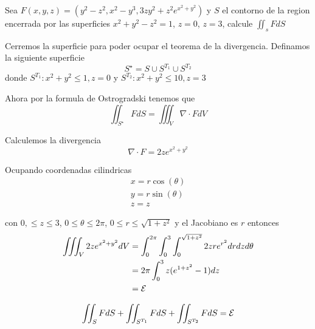 \message{ !name(MAT024.tex)}\documentclass[../main.tex]{subfiles}
\begin{document}
\begin{problem}
  Sea $F(x, y, z) = (y^{2} - z^{2}, x^{2} - y^{3}, 3zy^{2} + z^{2}e^{x^{2} + y^{2}})$ y $S$ el contorno de la region encerrada por las superficies $x^{2} + y^{2} - z^{2} = 1$, $z = 0$, $z = 3$, calcule $\iint_{s} F dS$
\end{problem}
\begin{solution}
  Cerremos la superficie para poder ocupar el teorema de la divergencia. Definamos la siguiente superficie
  \begin{equation*}
    S^{\star} = S \cup S^{T_{1}} \cup S^{T_{2}}
  \end{equation*}
  donde $S^{T_{1}}: x^{2} + y^{2} \leq 1,  z = 0$ y $S^{T_{2}}: x^{2} + y^{2} \leq 10, z = 3$

  Ahora por la formula de Ostrogradski tenemos que
  \begin{equation*}
    \iint_{S^{\star}} F dS = \iiint_{V} \nabla \cdot F dV
  \end{equation*}

  Calculemos la divergencia
  \begin{equation*}
    \nabla \cdot F = 2ze^{x^{2} + y^{2}}
  \end{equation*}

  Ocupando coordenadas cilindricas
  \begin{gather*}
    x = r \cos (\theta)\\
    y = r \sin (\theta)\\
    z = z
  \end{gather*}

  con $0, \leq z \leq 3$, $0 \leq \theta \leq 2\pi$, $0 \leq r \leq \sqrt{1 + z^{2}}$ y el Jacobiano es $r$ entonces
  \begin{align*}
    \iiint_{V} 2ze^{x^{2} + y^{2}} dV &= \int_{0}^{2\pi}\int_{0}^{3}\int_{0}^{\sqrt{1 + z^{2}}} 2zre^{r^{2}} dr dz d\theta\\
                                      &= 2\pi \int_{0}^{3} z(e^{1 + z^{2}} - 1) dz\\
    &= \mathcal{E}
  \end{align*}

  \begin{equation*}
    \iint_S F dS + \iint_{S^{T_1}} F dS + \iint_{S^{T_2}} F dS = \mathcal{E}
  \end{equation*}
\end{solution}
\end{document}
